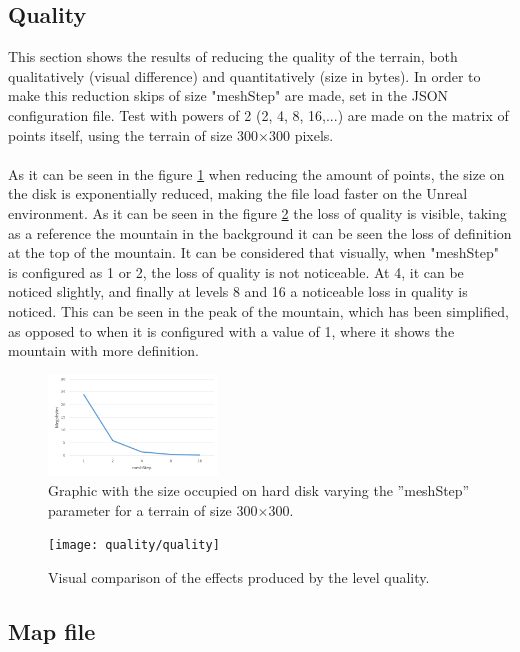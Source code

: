 \documentclass[10pt,a4paper,twocolumn,twoside]{article}
\begin{document}
\subsection{Quality}
\label{qualitat}
This section shows the results of reducing the quality of the terrain, both qualitatively (visual difference) and quantitatively (size in bytes). In order to make this reduction skips of size "meshStep" are made, set in the JSON configuration file. Test with powers of 2 (2, 4, 8, 16,...) are made on the matrix of points itself, using the terrain of size 300$\times$300 pixels.
\\
\\
As it can be seen in the figure \ref{fig-qualitatmegas} when reducing the amount of points, the size on the disk is exponentially reduced, making the file load faster on the Unreal environment. As it can be seen in the figure \ref{fig-qualityvisual}  the loss of quality is visible, taking as a reference the mountain in the background it can be seen the loss of definition at the top of the mountain. It can be considered that visually, when "meshStep" is configured as 1 or 2, the loss of quality is not noticeable. At 4, it can be noticed slightly, and finally at levels 8 and 16 a noticeable loss in quality is noticed. This can be seen in the peak of the mountain, which has been simplified, as opposed to when it is configured with a value of 1, where it shows the mountain with more definition.

\begin{figure}[!h]
\centering
  	\includegraphics[width=0.4\textwidth]{qualitatmegas}
	\caption{Graphic with the size occupied on hard disk varying the ''meshStep'' parameter for a terrain of size 300$\times$300.}
	\label{fig-qualitatmegas}
\end{figure}

\begin{figure}[!h]
\centering
  	\texttt{[image: quality/quality]}
	\caption{Visual comparison of the effects produced by the level quality.}
	\label{fig-qualityvisual}
\end{figure}

\subsection{Map file}
 
\end{document}
